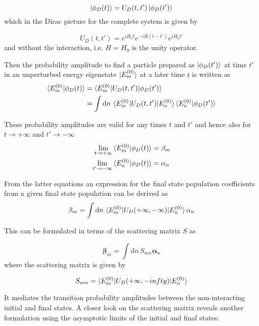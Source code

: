 \begin{equation}
 \ket{\phi_D(t)} = U_D(t,t')  \ket{\phi_D(t')}
\end{equation}
which in the Dirac picture for the complete system is given by

\begin{equation}
 U_D(t,t') = e^{iH_0t} e^{-iH(t-t')} e^{iH_0t'}
\end{equation}
and without the interaction, i.e. $H=H_0$ is the unity operator.

Then the probability amplitude to find a particle prepared as $\ket{\phi_D(t')}$
at time $t'$ in an unperturbed energy eigenstate $\ket{E_m^{(0)}}$ at a later
time $t$ is written as
\begin{align}
 \braket{E_m^{(0)} | \phi_D(t)} &= \braket{E_m^{(0)}| U_D(t,t') | \phi_D(t')}\\
  &= \int \mathrm{d} n \, \braket{E_m^{(0)}| U_D(t,t') |E_n^{(0)}}
     \braket{E_n^{(0)}|\phi_D(t')}
\end{align}

These probability amplitudes are valid for any times $t$ and $t'$ and hence also
for $t\rightarrow +\infty$ and $t' \rightarrow -\infty$
\begin{align}
 \lim_{t \to +\infty} \braket{E_m^{(0)} | \phi_D(t)} &= \mathbf{\beta}_m   \\
 \lim_{t' \to -\infty} \braket{E_n^{(0)} | \phi_D(t)} &= \mathbf{\alpha}_n
\end{align}

From the latter equations an expression for the final state population coefficients
from a given final state population can be derived as
\begin{align}
 \mathbf{\beta}_m = \int \mathrm{d} n \,
     \braket{E_m^{(0)}| U_D(+\infty,-\infty) |E_n^{(0)}} \mathbf{\alpha}_n
\end{align}

This can be formulated in terms of the scattering matrix $S$ as

\begin{equation}
  \mathbf{\beta}_m = \int \mathrm{d} n \, S_{mn} \mathbf{\alpha}_n
\end{equation}
where the scattering matrix is given by

\begin{equation}
  S_{mn} = \braket{E_m^{(0)}| U_D(+\infty,-infty) |E_n^{(0)}}
\end{equation}

It mediates the transition probability amplitudes between the non-interacting
initial and final states. A closer look on the scattering matrix reveals another
formulation using the asymptotic limits of the initial and final states:

